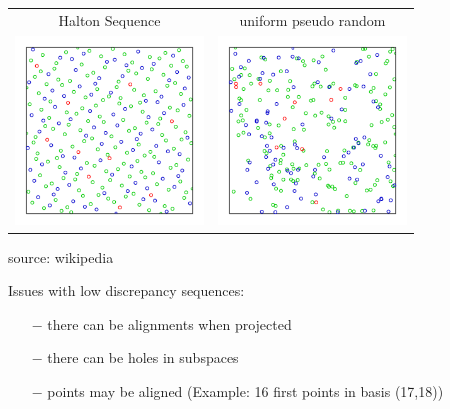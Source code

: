 \begin{frame}{}
\begin{example}
\begin{center}
  \begin{tabular}{cc}
Halton Sequence & uniform pseudo random \\
\includegraphics[height=5cm]{2_Design_of_experiments/figures/Halton} & \includegraphics[height=5cm]{2_Design_of_experiments/figures/random}
  \end{tabular}
 source: wikipedia
\end{center}
\end{example}
\end{frame}

\begin{frame}{}
Issues with low discrepancy sequences:
\begin{itemize}
	\item[$-$] there can be alignments when projected
	\item[$-$] there can be holes in subspaces
	\item[$-$] points may be aligned (Example: 16 first points in basis (17,18))
\end{itemize}
\end{frame}

